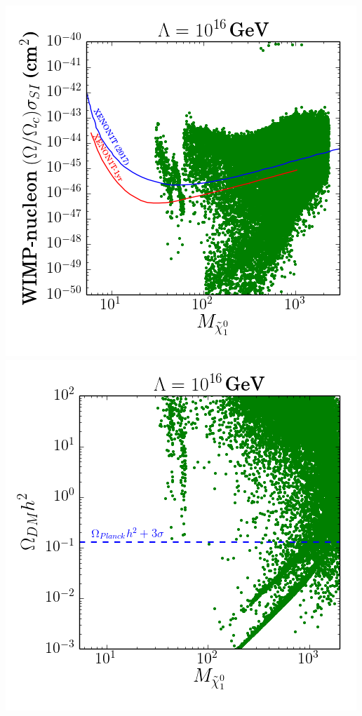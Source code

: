 \begin{center}
	\includegraphics[height=0.21\paperheight]{figures/plot_nucleon.png}
	\includegraphics[height=0.21\paperheight]{figures/plot_relic.png}

\end{center}
